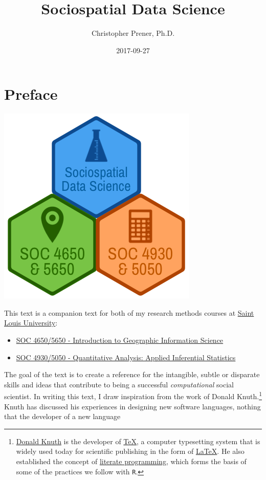 \documentclass[]{book}
\title{Sociospatial Data Science}
\author{Christopher Prener, Ph.D.}
\date{2017-09-27}
\providecommand{\tightlist}{%
  \setlength{\itemsep}{0pt}\setlength{\parskip}{0pt}}
\let\rmarkdownfootnote\footnote%
\def\footnote{\protect\rmarkdownfootnote}
\theoremstyle{definition}
\theoremstyle{definition}
\theoremstyle{definition}
\theoremstyle{remark}
\begin{document}
\maketitle

{
\setcounter{tocdepth}{1}
\tableofcontents
}
\chapter*{Preface}\label{preface}

\begin{center}\includegraphics[width=0.4\linewidth]{images/SSDSBookBanner} \end{center}

This text is a companion text for both of my research methods courses at
\href{https://slu.edu}{Saint Louis University}:

\begin{itemize}
\tightlist
\item
  \href{https://slu-soc5650.github.io}{SOC 4650/5650 - Introduction to
  Geographic Information Science}
\item
  \href{https://slu-soc5050.github.io}{SOC 4930/5050 - Quantitative
  Analysis: Applied Inferential Statistics}
\end{itemize}

The goal of the text is to create a reference for the intangible, subtle
or disparate skills and ideas that contribute to being a successful
\emph{computational} social scientist. In writing this text, I draw
inspiration from the work of Donald Knuth.\footnote{\href{https://en.wikipedia.org/wiki/Donald_Knuth}{Donald
  Knuth} is the developer of
  \href{https://en.wikipedia.org/wiki/TeX}{TeX}, a computer typesetting
  system that is widely used today for scientific publishing in the form
  of \href{https://en.wikipedia.org/wiki/LaTeX}{LaTeX}. He also
  established the concept of
  \href{https://en.wikipedia.org/wiki/Literate_programming}{literate
  programming}, which forms the basis of some of the practices we follow
  with \texttt{R}.} Knuth has discussed his experiences in designing new
software languages, nothing that the developer of a new language
\end{document}
